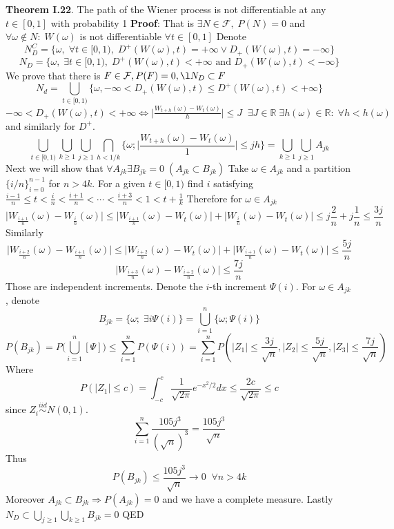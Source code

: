 \documentclass[english]{article}
\newcommand{\R}{\mathbb{R}}
\newcommand{\note}[1]{\noindent\textbf{#1}}
\newcommand{\F}{\mathcal F}
\begin{document}
\note{Theorem I.22}. The path of the Wiener process is not differentiable at any $t\in [0,1]$ with probability 1 \newline
\note{Proof}: That is $\exists N \in \mathcal F,\; P(N)=0$ and $\forall \omega \notin N:\; W(\omega)$ is not differentiable $\forall t\in[0,1]$ \newline
Denote 
$$N_D^C = \{\omega,\; \forall t\in [0,1),\; D^+(W(\omega),t) = +\infty \vee D_+(W(\omega),t) = -\infty \}$$
$$N_D = \{\omega,\; \exists t\in [0,1),\; D^+(W(\omega),t) < +\infty \text{ and } D_+(W(\omega),t) < -\infty \}$$
We prove that there is $F\in\F, P(F)=0,\l N_D\subset F$
$$N_d = \bigcup_{t\in [0,1)} \{ \omega, -\infty < D_+(W(\omega), t) \leq D^+ (W(\omega),t) < +\infty \}$$
$-\infty < D_+(W(\omega), t) < +\infty \iff \Big| \frac{W_{t+h}(\omega) - W_t (\omega)}{h} \Big| \leq J \;\; \exists J\in\R \; \exists h(\omega)\in\R:\; \forall h<h(\omega)$ and similarly for $D^+$.
$$\bigcup_{t\in[0,1)} \bigcup_{k\geq 1} \bigcup_{j \geq 1} \bigcap_{h<1/k} \bigg\{ \omega; \Big| \frac{W_{t+h}(\omega) - W_t(\omega)}{1} \Big| \leq jh \bigg\} = \bigcup_{k\geq 1} \bigcup_{j\geq 1} A_{jk}$$
Next we will show that $\forall A_{jk} \exists B_{jk} = 0\; (A_{jk} \subset B_{jk})$ \;
Take $\omega \in A_{jk}$ and a partition $\{i/n\}^{n-1}_{i=0}$ for $n > 4k$. For a given $t \in [0,1)$ find $i$ satisfying $\frac {i-1}n \leq t < \frac in < \frac{i+1}n < \cdots < \frac {i+3}n < 1 < t+ \frac 1k$ \newline
Therefore for $\omega \in A_{jk}$
$$\Big| W_{\frac{i+1}n}(\omega) - W_{\frac in} (\omega) \Big| \leq \Big| W_{\frac{i+1}n}(\omega) - W_{t}(\omega) \Big| + \Big| W_{\frac in}(\omega) - W_t(\omega)\Big| \leq j \frac 2n + j \frac 1n \leq \frac{3j}n$$
Similarly
$$\Big| W_{\frac{i+2}n}(\omega) - W_{\frac {i+1}n} (\omega) \Big| \leq \Big| W_{\frac{i+2}n}(\omega) - W_{t}(\omega) \Big| + \Big| W_{\frac {i+1}n}(\omega) - W_t(\omega)\Big| \leq  \frac{5j}n$$
$$\Big| W_{\frac{i+3}n}(\omega) - W_{\frac {i+2}n} (\omega) \Big|  \leq  \frac{7j}n$$
Those are independent increments. Denote the $i$-th increment $\Psi(i)$. For $\omega\in A_{jk}$, denote 
$$B_{jk} = \{\omega;\; \exists i \Psi(i) \} = \bigcup^n_{i=1} \{ \omega; \Psi(i)\}$$
$$P(B_{jk}) = P \Big( \bigcup^n_{i=1} [ \Psi ] \Big) \leq \sum^n_{i=1} P(\Psi(i)) = \sum^n_{i=1} P(|Z_1| \leq \frac {3j}{\sqrt n}, |Z_2| \leq \frac{5j}{\sqrt n}, |Z_3| \leq \frac{7j}{\sqrt n})$$
Where
$$P(|Z_1| \leq c) = \int^c_{-c} \frac {1}{\sqrt {2\pi}} e^{-x^2/2} dx \leq \frac{2c}{\sqrt {2\pi}} \leq c$$
since $Z_i \stackrel{iid}\sim N(0,1)$.
$$\sum^n_{i=1} \frac{105j^3}{(\sqrt n)^3} = \frac{105j^3}{\sqrt n}$$
Thus
$$P(B_{jk}) \leq \frac{105j^3}{\sqrt n} \to 0 \;\; \forall n > 4k$$
Moreover $A_{jk} \subset B_{jk} \Rightarrow P(A_{jk})=0$ and we have a complete measure. Lastly $N_D \subset \bigcup_{j\geq 1}\bigcup_{k\geq 1} B_{jk} =0$ \newline
QED \newline
\end{document}
